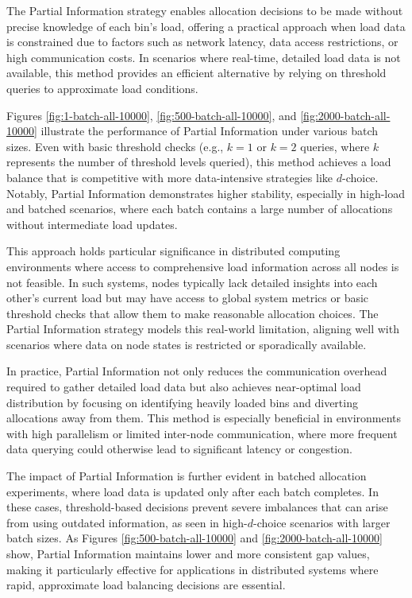 \documentclass[11pt]{article}
\begin{document}
The Partial Information strategy enables allocation decisions to be made without
precise knowledge of each bin's load, offering a practical approach when load
data is constrained due to factors such as network latency, data access
restrictions, or high communication costs. In scenarios where real-time,
detailed load data is not available, this method provides an efficient
alternative by relying on threshold queries to approximate load conditions.

Figures \ref{fig:1-batch-all-10000}, \ref{fig:500-batch-all-10000}, and
\ref{fig:2000-batch-all-10000} illustrate the performance of Partial Information
under various batch sizes. Even with basic threshold checks (e.g., $k=1$ or
$k=2$ queries, where $k$ represents the number of threshold levels queried),
this method achieves a load balance that is competitive with more data-intensive
strategies like $d$-choice. Notably, Partial Information demonstrates higher
stability, especially in high-load and batched scenarios, where each batch
contains a large number of allocations without intermediate load updates.

This approach holds particular significance in distributed computing
environments where access to comprehensive load information across all nodes is
not feasible. In such systems, nodes typically lack detailed insights into each
other’s current load but may have access to global system metrics or basic
threshold checks that allow them to make reasonable allocation choices. The
Partial Information strategy models this real-world limitation, aligning well
with scenarios where data on node states is restricted or sporadically
available.

In practice, Partial Information not only reduces the communication overhead
required to gather detailed load data but also achieves near-optimal load
distribution by focusing on identifying heavily loaded bins and diverting
allocations away from them. This method is especially beneficial in environments
with high parallelism or limited inter-node communication, where more frequent
data querying could otherwise lead to significant latency or congestion.

The impact of Partial Information is further evident in batched allocation
experiments, where load data is updated only after each batch completes. In
these cases, threshold-based decisions prevent severe imbalances that can arise
from using outdated information, as seen in high-$d$-choice scenarios with
larger batch sizes. As Figures \ref{fig:500-batch-all-10000} and
\ref{fig:2000-batch-all-10000} show, Partial Information maintains lower and
more consistent gap values, making it particularly effective for applications in
distributed systems where rapid, approximate load balancing decisions are
essential.
\end{document}
